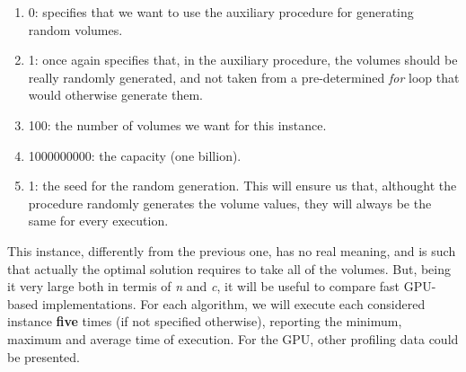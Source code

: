 \documentclass[12pt]{extarticle}
\begin{document}
\begin{enumerate}
    \item 0: specifies that we want to use the auxiliary procedure for generating random volumes.
    \item 1: once again specifies that, in the auxiliary procedure, the volumes should be really randomly generated, and not taken from a pre-determined \emph{for} loop that would otherwise generate them.
    \item 100: the number of volumes we want for this instance.
    \item 1000000000: the capacity (one billion).
    \item 1: the seed for the random generation. This will ensure us that, althought the procedure randomly generates the volume values, they will always be the same for every execution.
\end{enumerate}
This instance, differently from the previous one, has no real meaning, and is such that actually the optimal solution requires to take all of the volumes. But, being it very large both in termis of \emph{n} and \emph{c}, it will be useful to compare fast GPU-based implementations.\newline
\newline
For each algorithm, we will execute each considered instance \textbf{five} times (if not specified otherwise), reporting the minimum, maximum and average time of execution. For the GPU, other profiling data could be presented.
\end{document}
